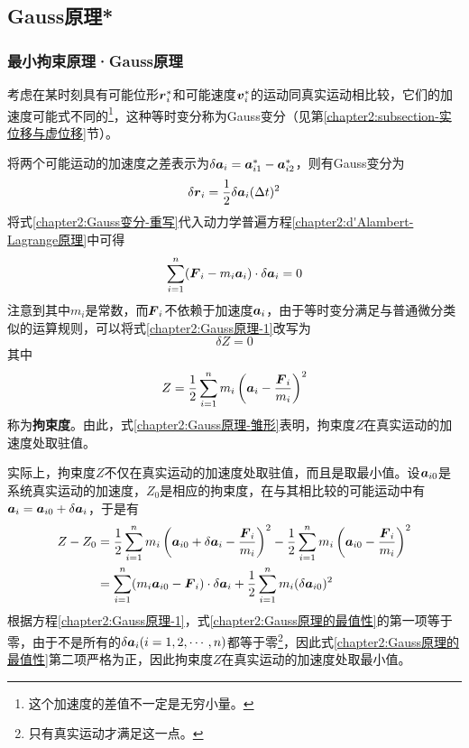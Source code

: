 \subsection{Gauss原理*}

\subsubsection{最小拘束原理·Gauss原理}\label{chapter2:subsubsection-最小拘束原理·Gauss原理}

考虑在某时刻具有可能位形$\boldsymbol{r}_i^*$和可能速度$\boldsymbol{v}_i^*$的运动同真实运动相比较，它们的加速度可能式不同的\footnote{这个加速度的差值不一定是无穷小量。}，这种等时变分称为Gauss变分（见第\ref{chapter2:subsection-实位移与虚位移}节）。

将两个可能运动的加速度之差表示为$\delta\boldsymbol{a}_i=\boldsymbol{a}_{i1}^*-\boldsymbol{a}_{i2}^*$，则有Gauss变分为
\begin{equation}
	\delta\boldsymbol{r}_i = \frac12 \delta\boldsymbol{a}_i(\Delta t)^2
	\label{chapter2:Gauss变分-重写}
\end{equation}
将式\eqref{chapter2:Gauss变分-重写}代入动力学普遍方程\eqref{chapter2:d'Alambert-Lagrange原理}中可得
\begin{equation}
	\sum_{i=1}^n (\boldsymbol{F}_i-m_i\boldsymbol{a}_i)\cdot \delta\boldsymbol{a}_i=0
	\label{chapter2:Gauss原理-1}
\end{equation}
注意到其中$m_i$是常数，而$\boldsymbol{F}_i$不依赖于加速度$\boldsymbol{a}_i$，由于等时变分满足与普通微分类似的运算规则，可以将式\eqref{chapter2:Gauss原理-1}改写为
\begin{equation}
	\delta Z = 0
	\label{chapter2:Gauss原理-雏形}
\end{equation}
其中
\begin{equation}
	Z = \frac12 \sum_{i=1}^nm_i\left(\boldsymbol{a}_i-\frac{\boldsymbol{F}_i}{m_i}\right)^2
	\label{chapter2:拘束度定义}
\end{equation}
称为{\bf 拘束度}。由此，式\eqref{chapter2:Gauss原理-雏形}表明，拘束度$Z$在真实运动的加速度处取驻值。

实际上，拘束度$Z$不仅在真实运动的加速度处取驻值，而且是取最小值。设$\boldsymbol{a}_{i0}$是系统真实运动的加速度，$Z_0$是相应的拘束度，在与其相比较的可能运动中有$\boldsymbol{a}_i=\boldsymbol{a}_{i0}+\delta\boldsymbol{a}_i$，于是有
\begin{align}
	Z-Z_0 & = \frac12\sum_{i=1}^nm_i\left(\boldsymbol{a}_{i0}+\delta\boldsymbol{a}_i-\frac{\boldsymbol{F}_i}{m_i}\right)^2 - \frac12\sum_{i=1}^nm_i\left(\boldsymbol{a}_{i0}-\frac{\boldsymbol{F}_i}{m_i}\right)^2 \nonumber \\
	& = \sum_{i=1}^n (m_i\boldsymbol{a}_{i0}-\boldsymbol{F}_i)\cdot \delta\boldsymbol{a}_i + \frac12 \sum_{i=1}^n m_i(\delta \boldsymbol{a}_{i0})^2
	\label{chapter2:Gauss原理的最值性}
\end{align}
根据方程\eqref{chapter2:Gauss原理-1}，式\eqref{chapter2:Gauss原理的最值性}的第一项等于零，由于不是所有的$\delta\boldsymbol{a}_i(i=1,2,\cdots,n)$都等于零\footnote{只有真实运动才满足这一点。}，因此式\eqref{chapter2:Gauss原理的最值性}第二项严格为正，因此拘束度$Z$在真实运动的加速度处取最小值。

